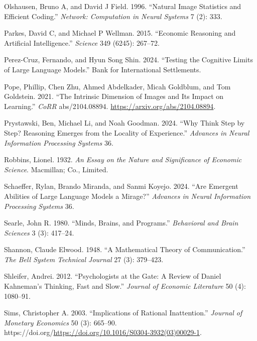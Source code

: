 \documentclass[
]{article}
\newlength{\cslhangindent}
\newenvironment{CSLReferences}[2] %
 {\begin{list}{}{%
  \setlength{\itemindent}{0pt}
  \setlength{\leftmargin}{0pt}
  \setlength{\parsep}{0pt}
  \ifodd #1
   \setlength{\leftmargin}{\cslhangindent}
   \setlength{\itemindent}{-1\cslhangindent}
  \fi
  \setlength{\itemsep}{#2\baselineskip}}}
 {\end{list}}
\begin{document}
\begin{CSLReferences}{1}{0}
Olshausen, Bruno A, and David J Field. 1996. {``Natural Image Statistics
and Efficient Coding.''} \emph{Network: Computation in Neural Systems} 7
(2): 333.

Parkes, David C, and Michael P Wellman. 2015. {``Economic Reasoning and
Artificial Intelligence.''} \emph{Science} 349 (6245): 267--72.

Perez-Cruz, Fernando, and Hyun Song Shin. 2024. {``Testing the Cognitive
Limits of Large Language Models.''} Bank for International Settlements.

Pope, Phillip, Chen Zhu, Ahmed Abdelkader, Micah Goldblum, and Tom
Goldstein. 2021. {``The Intrinsic Dimension of Images and Its Impact on
Learning.''} \emph{CoRR} abs/2104.08894.
\url{https://arxiv.org/abs/2104.08894}.

Prystawski, Ben, Michael Li, and Noah Goodman. 2024. {``Why Think Step
by Step? Reasoning Emerges from the Locality of Experience.''}
\emph{Advances in Neural Information Processing Systems} 36.

Robbins, Lionel. 1932. \emph{An Essay on the Nature and Significance of
Economic Science}. Macmillan; Co., Limited.

Schaeffer, Rylan, Brando Miranda, and Sanmi Koyejo. 2024. {``Are
Emergent Abilities of Large Language Models a Mirage?''} \emph{Advances
in Neural Information Processing Systems} 36.

Searle, John R. 1980. {``Minds, Brains, and Programs.''}
\emph{Behavioral and Brain Sciences} 3 (3): 417--24.

Shannon, Claude Elwood. 1948. {``A Mathematical Theory of
Communication.''} \emph{The Bell System Technical Journal} 27 (3):
379--423.

Shleifer, Andrei. 2012. {``Psychologists at the Gate: A Review of Daniel
Kahneman's Thinking, Fast and Slow.''} \emph{Journal of Economic
Literature} 50 (4): 1080--91.

Sims, Christopher A. 2003. {``Implications of Rational Inattention.''}
\emph{Journal of Monetary Economics} 50 (3): 665--90.
https://doi.org/\url{https://doi.org/10.1016/S0304-3932(03)00029-1}.


\end{CSLReferences}
\end{document}
